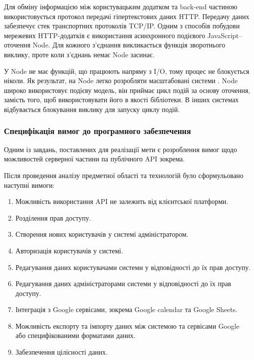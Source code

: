 Для обміну інформацією між користувацьким додатком та back-end частиною використовується протокол передачі гіпертекстових даних HTTP. Передачу даних забезпечує стек транспортних протоколів TCP/IP.
Одним з способів побудови мережевих HTTP-додатків є використання  асинхронного подієвого JavaScript–оточення Node. Для кожного з’єднання викликається функція зворотнього виклику, проте коли з’єднань немає Node засинає.

У Node не має функцій, що працюють напряму з I/O, тому процес не блокується ніколи. Як результат, на Node легко розробляти масштабовані системи \cite{zeiss2015node}.
Node широко використовує подієву модель, він приймає цикл подій за основу оточення, замість того, щоб використовувати його в якості бібліотеки. В інших системах відбувається блокування виклику для запуску циклу подій.

\subsubsection{Специфікація вимог до програмного забезпечення}

Одним із завдань, поставлених для реалізації мети є розроблення вимог щодо можливостей серверної частини па публічного API зокрема.

Після проведення аналізу предметної області та технологій було сформульовано наступні вимоги:

\begin{enumerate}
    \item Можливість використання API не залежить від клієнтської платформи.
    \item Розділення прав доступу.
    \item Створення нових користувачів у системі адміністратором.
    \item Авторизація користувачів у системі.
    \item Редагування даних користувачами системи у відповідності до їх прав доступу.
    \item Редагування даних адміністраторами системи у відповідності до їх прав доступу.
    \item Інтеграція з Google сервісами, зокрема Google calendar та Google Sheets.
    \item Можливість експорту та імпорту даних між системою та сервісами Google або специфікованими форматами даних.
    \item Забезпечення цілісності даних.
\end{enumerate}


